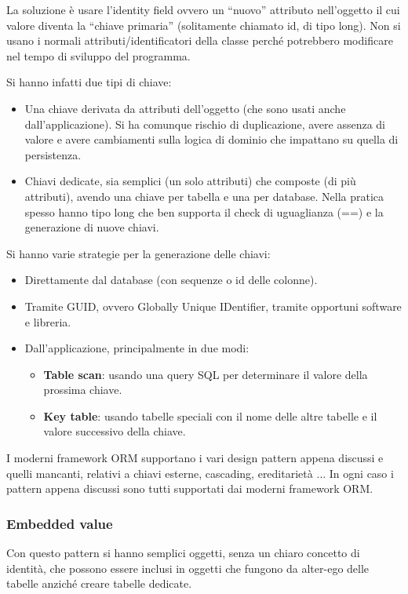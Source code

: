 La soluzione è usare l'identity field ovvero un “nuovo” attributo nell'oggetto
il cui valore diventa la “chiave primaria” (solitamente chiamato id, di tipo long).
Non si usano i normali attributi/identificatori della classe perché potrebbero
modificare nel tempo di sviluppo del programma.

Si hanno infatti due tipi di chiave:
\begin{itemize}
      \item Una chiave derivata da attributi dell'oggetto (che sono usati anche
            dall'applicazione). Si ha comunque rischio di duplicazione, avere
            assenza di valore e avere cambiamenti sulla logica di dominio che
            impattano su quella di persistenza.
      \item Chiavi dedicate, sia semplici (un solo attributi) che composte (di
            più attributi), avendo una chiave per tabella e una per database.
            Nella pratica spesso hanno tipo long che ben supporta il check di
            uguaglianza (==) e la generazione di nuove chiavi.
\end{itemize}
Si hanno varie strategie per la generazione delle chiavi:
\begin{itemize}
      \item Direttamente dal database (con sequenze o id delle colonne).
      \item Tramite GUID, ovvero Globally Unique IDentifier, tramite opportuni
            software e libreria.
      \item Dall'applicazione, principalmente in due modi:
            \begin{itemize}
                  \item \textbf{Table scan}: usando una query SQL per determinare
                        il valore della prossima chiave.
                  \item \textbf{Key table}: usando tabelle speciali con il nome
                        delle altre tabelle e il valore successivo della chiave.
            \end{itemize}
\end{itemize}
I moderni framework ORM supportano i vari design pattern appena discussi e quelli
mancanti, relativi a chiavi esterne, cascading, ereditarietà $\dots$ In ogni caso
i pattern appena discussi sono tutti supportati dai moderni framework ORM.
\subsubsection{Embedded value}
Con questo pattern si hanno semplici oggetti, senza un chiaro concetto di
identità, che possono essere inclusi in oggetti che fungono da alter-ego delle
tabelle anziché creare tabelle dedicate.
